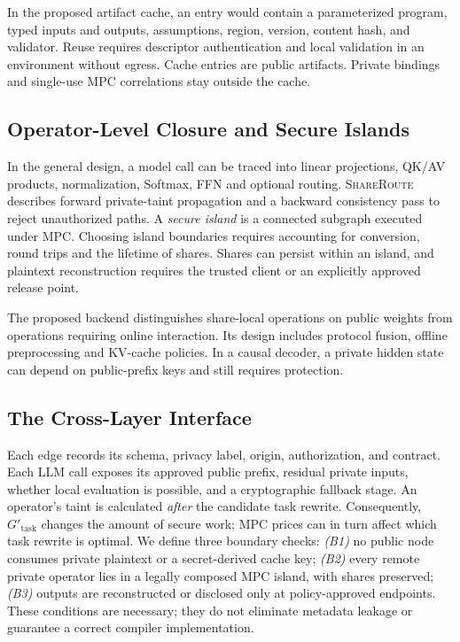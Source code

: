 \documentclass[runningheads]{llncs}
\newcommand{\Gtnew}{G'_{\mathrm{task}}}
\newcommand{\srcB}{\textsc{ShareRoute}}
\begin{document}
In the proposed artifact cache, an entry would contain a parameterized
program, typed inputs and outputs, assumptions, region, version, content
hash, and validator. Reuse requires descriptor authentication and local
validation in an environment without egress. Cache entries are public
artifacts. Private bindings and single-use MPC correlations stay outside
the cache.

\subsection{Operator-Level Closure and Secure Islands}
In the general design, a model call can be traced into linear projections,
QK/AV products, normalization, Softmax, FFN and optional routing.
\srcB{} describes forward private-taint propagation and a backward
consistency pass to reject unauthorized paths. A \emph{secure island} is
a connected subgraph executed under MPC. Choosing island boundaries
requires accounting for conversion, round trips and the lifetime of shares.
Shares can persist within an island, and plaintext reconstruction requires
the trusted client or an explicitly approved release point.

The proposed backend distinguishes share-local operations on public
weights from operations requiring online interaction. Its design includes
protocol fusion, offline preprocessing and KV-cache policies. In a causal
decoder, a private hidden state can depend on public-prefix keys and still
requires protection.

\subsection{The Cross-Layer Interface}
Each edge records its schema, privacy label, origin, authorization, and contract. Each LLM call exposes its approved public prefix, residual private inputs, whether local evaluation is possible, and a cryptographic fallback stage. An operator's taint is calculated \emph{after} the candidate task rewrite. Consequently, $\Gtnew$ changes the amount of secure work; MPC prices can in turn affect which task rewrite is optimal. We define three boundary checks: \emph{(B1)} no public node consumes private plaintext or a secret-derived cache key; \emph{(B2)} every remote private operator lies in a legally composed MPC island, with shares preserved; \emph{(B3)} outputs are reconstructed or disclosed only at policy-approved endpoints. These conditions are necessary; they do not eliminate metadata leakage or guarantee a correct compiler implementation.
\end{document}
